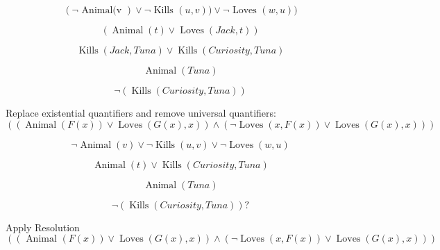 \documentclass{article}[18pt]
\begin{document}
\begin{equation}\label{eq:8}( \neg \text { Animal(v } ) \vee \neg \text { Kills } ( u , v ) ) \vee \neg \text { Loves } ( w , u ) )\end{equation}

\begin{equation}\label{eq:9}(\operatorname{Animal}(t)\lor \operatorname{Loves}(Jack,t))\end{equation}

\begin{equation}\label{eq:10}\operatorname{Kills}(Jack, Tuna)\lor \operatorname{Kills}(Curiosity, Tuna)\end{equation}

\begin{equation}\label{eq:11}\operatorname{Animal}(Tuna)\end{equation}

\begin{equation}\label{eq:12}\lnot(\operatorname{Kills}(Curiosity, Tuna))\end{equation}

Replace existential quantifiers and remove universal quantifiers:
\setcounter{equation}{0}
\begin{equation}\label{eq:13}((\operatorname{Animal}(F(x))\lor \operatorname{Loves}(G(x),x)) \land (\lnot \operatorname{Loves}(x,F(x)) \lor \operatorname{Loves}(G(x),x)) )\end{equation}

\begin{equation}\label{eq:14}\lnot \operatorname{Animal}(v)\lor \lnot \operatorname{Kills}(u,v) \lor \lnot \operatorname{Loves}(w,u)\end{equation}

\begin{equation}\label{eq:15}\operatorname{Animal}(t)\lor \operatorname{Kills}(Curiosity, Tuna)\end{equation}

\begin{equation}\label{eq:16}\operatorname{Animal}(Tuna)\end{equation}

\begin{equation}\label{eq:17}\lnot(\operatorname{Kills}(Curiosity, Tuna))?\end{equation}

Apply Resolution
\setcounter{equation}{0}
\begin{equation}\label{eq:18}( ( \text { Animal } ( F ( x ) ) \vee \operatorname { Loves } ( G ( x ) , x ) ) \wedge ( \neg \operatorname { Loves } ( x , F ( x ) ) \vee \operatorname { Loves } ( G ( x ) , x ) ) )\end{equation}
\end{document}
